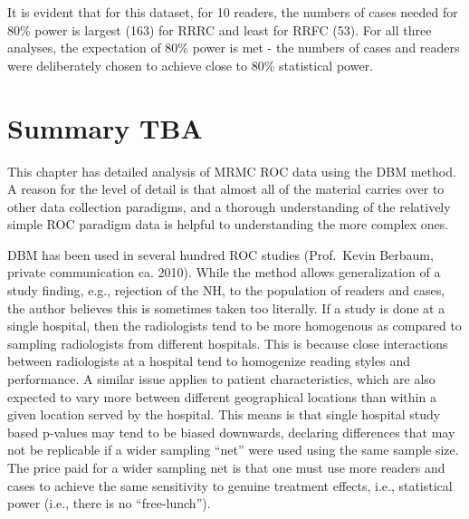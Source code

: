 \documentclass[
]{book}
\begin{document}
It is evident that for this dataset, for 10 readers, the numbers of cases needed for 80\% power is largest (163) for RRRC and least for RRFC (53). For all three analyses, the expectation of 80\% power is met - the numbers of cases and readers were deliberately chosen to achieve close to 80\% statistical power.

\hypertarget{DBMAnalysisSigtesting-summary}{%
\section{Summary TBA}\label{DBMAnalysisSigtesting-summary}}

This chapter has detailed analysis of MRMC ROC data using the DBM method. A reason for the level of detail is that almost all of the material carries over to other data collection paradigms, and a thorough understanding of the relatively simple ROC paradigm data is helpful to understanding the more complex ones.

DBM has been used in several hundred ROC studies (Prof.~Kevin Berbaum, private communication ca. 2010). While the method allows generalization of a study finding, e.g., rejection of the NH, to the population of readers and cases, the author believes this is sometimes taken too literally. If a study is done at a single hospital, then the radiologists tend to be more homogenous as compared to sampling radiologists from different hospitals. This is because close interactions between radiologists at a hospital tend to homogenize reading styles and performance. A similar issue applies to patient characteristics, which are also expected to vary more between different geographical locations than within a given location served by the hospital. This means is that single hospital study based p-values may tend to be biased downwards, declaring differences that may not be replicable if a wider sampling ``net'' were used using the same sample size. The price paid for a wider sampling net is that one must use more readers and cases to achieve the same sensitivity to genuine treatment effects, i.e., statistical power (i.e., there is no ``free-lunch'').
\end{document}
